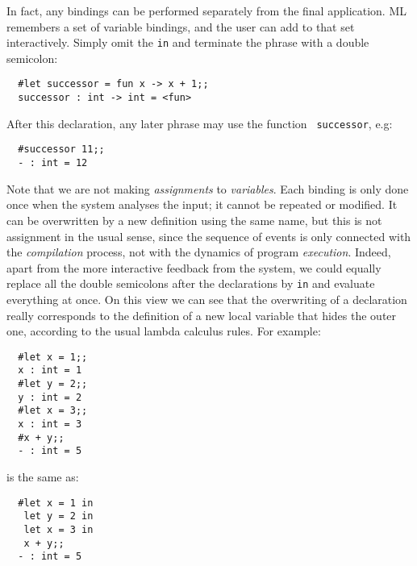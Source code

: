 In fact, any bindings can be performed separately from the final application.
ML remembers a set of variable bindings, and the user can add to that set
interactively. Simply omit the {\tt in} and terminate the phrase with a double
semicolon:

\begin{boxed}\begin{verbatim}
  #let successor = fun x -> x + 1;;
  successor : int -> int = <fun>
\end{verbatim}\end{boxed}

\noindent After this declaration, any later phrase may use the function {\tt
successor}, e.g:

\begin{boxed}\begin{verbatim}
  #successor 11;;
  - : int = 12
\end{verbatim}\end{boxed}

Note that we are not making {\em assignments} to {\em variables}. Each binding
is only done once when the system analyses the input; it cannot be repeated or
modified. It can be overwritten by a new definition using the same name, but
this is not assignment in the usual sense, since the sequence of events is only
connected with the {\em compilation} process, not with the dynamics of program
{\em execution}. Indeed, apart from the more interactive feedback from the
system, we could equally replace all the double semicolons after the
declarations by {\tt in} and evaluate everything at once. On this view we can
see that the overwriting of a declaration really corresponds to the definition
of a new local variable that hides the outer one, according to the usual lambda
calculus rules. For example:

\begin{boxed}\begin{verbatim}
  #let x = 1;;
  x : int = 1
  #let y = 2;;
  y : int = 2
  #let x = 3;;
  x : int = 3
  #x + y;;
  - : int = 5
\end{verbatim}\end{boxed}

\noindent is the same as:

\begin{boxed}\begin{verbatim}
  #let x = 1 in
   let y = 2 in
   let x = 3 in
   x + y;;
  - : int = 5
\end{verbatim}\end{boxed}

